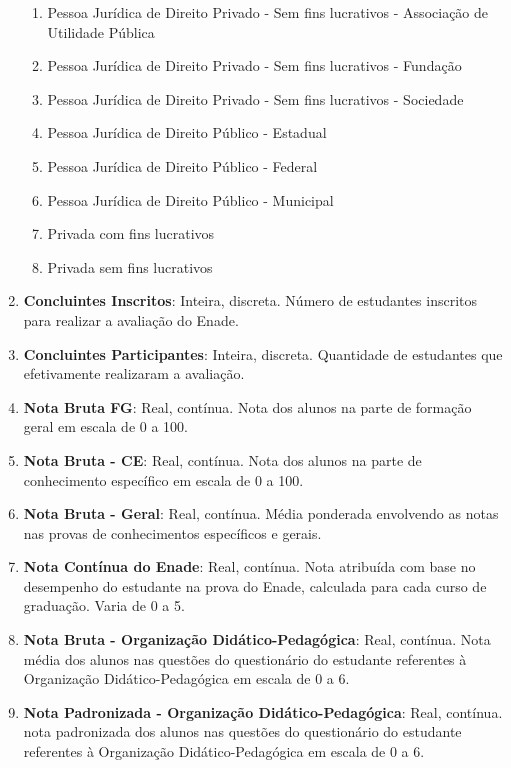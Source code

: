 \begin{enumerate}
\begin{enumerate}
			\item Pessoa Jurídica de Direito Privado - Sem fins lucrativos - Associação de Utilidade Pública 
			\item Pessoa Jurídica de Direito Privado - Sem fins lucrativos - Fundação                       
			\item Pessoa Jurídica de Direito Privado - Sem fins lucrativos - Sociedade                       
			\item Pessoa Jurídica de Direito Público - Estadual                                              
			\item Pessoa Jurídica de Direito Público - Federal                                               
			\item Pessoa Jurídica de Direito Público - Municipal                                             
			\item Privada com fins lucrativos                                                                
			\item Privada sem fins lucrativos
		\end{enumerate}
	\item \textbf{Concluintes Inscritos}: Inteira, discreta. Número de estudantes inscritos para realizar a avaliação do Enade.\
	\item \textbf{Concluintes Participantes}: Inteira, discreta. Quantidade de estudantes que efetivamente realizaram a avaliação.\
	\item \textbf{Nota Bruta FG}: Real, contínua. Nota dos alunos na parte de formação geral em escala de 0 a 100.\
	\item \textbf{Nota Bruta - CE}: Real, contínua. Nota dos alunos na parte de conhecimento específico em escala de 0 a 100.
	\item \textbf{Nota Bruta - Geral}: Real, contínua. Média ponderada envolvendo as notas nas provas de conhecimentos específicos e gerais.
	\item \textbf{Nota Contínua do Enade}: Real, contínua. Nota atribuída com base no desempenho do estudante na prova do Enade, calculada para cada curso de graduação. Varia de 0 a 5.
	\item \textbf{Nota Bruta - Organização Didático-Pedagógica}: Real, contínua. Nota média dos alunos nas questões do questionário do estudante referentes à Organização Didático-Pedagógica em escala de 0 a 6.
	\item \textbf{Nota Padronizada - Organização Didático-Pedagógica}: Real, contínua. nota padronizada dos alunos nas questões do questionário do estudante referentes à Organização Didático-Pedagógica em escala de 0 a 6.

\end{enumerate}
